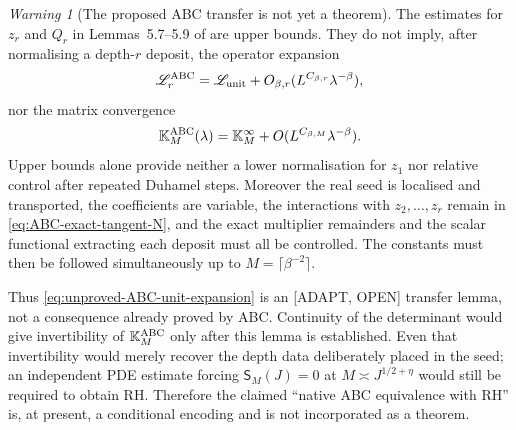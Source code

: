 \documentclass[11pt]{amsart}
\numberwithin{equation}{section}
\theoremstyle{plain}
\theoremstyle{definition}
\theoremstyle{remark}
\newtheorem{warning}[theorem]{Warning}
\begin{document}
\begin{warning}[The proposed ABC transfer is not yet a theorem]
\label{warn:depth-transfer-open}
The estimates for $z_r$ and $Q_r$ in Lemmas~5.7--5.9 of
\cite{AlpogeBuckmasterCoiculescu2026} are upper bounds.  They do not imply,
after normalising a depth-$r$ deposit, the operator expansion
\begin{equation}
 \mathscr L_r^{\rm ABC}=\mathscr L_{\rm unit}
 +O_{\beta,r}(L^{C_{\beta,r}}\lambda^{-\beta}),
\label{eq:unproved-ABC-unit-expansion}
\end{equation}
nor the matrix convergence
\begin{equation}
 \mathbb K_M^{\rm ABC}(\lambda)
 =\mathbb K_M^\infty+O(L^{C_{\beta,M}}\lambda^{-\beta}).
\label{eq:unproved-ABC-matrix-convergence}
\end{equation}
Upper bounds alone provide neither a lower normalisation for $z_1$ nor
relative control after repeated Duhamel steps.  Moreover the real seed is
localised and transported, the coefficients are variable, the interactions
with $z_2,\ldots,z_r$ remain in \eqref{eq:ABC-exact-tangent-N}, and the exact
multiplier remainders and the scalar functional extracting each deposit must
all be controlled.  The constants must then be followed simultaneously up
to $M=\lceil\beta^{-2}\rceil$.

Thus \eqref{eq:unproved-ABC-unit-expansion} is an \textup{[ADAPT, OPEN]}
transfer lemma, not a consequence already proved by ABC.  Continuity of the
determinant would give invertibility of $\mathbb K_M^{\rm ABC}$ only after
this lemma is established.  Even that invertibility would merely recover the
depth data deliberately placed in the seed; an independent PDE estimate
forcing $\mathsf S_M(J)=0$ at $M\asymp J^{1/2+\eta}$ would still be required
to obtain RH.  Therefore the claimed ``native ABC equivalence with RH'' is,
at present, a conditional encoding and is not incorporated as a theorem.
\end{warning}
\end{document}
